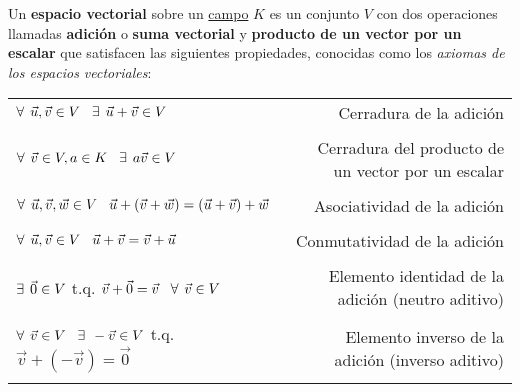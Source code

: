 \documentclass[notasLineal]{subfiles}
\begin{document}
\begin{tcolorbox}[breakable]
    \begin{Def}\label{Def: Espacio vectorial}
        Un \textbf{espacio vectorial} sobre un \hyperlink{Sssec: Definición de campo}{campo} $K$ es un conjunto $V$ con dos operaciones llamadas \textbf{adición} o \textbf{suma vectorial} y \textbf{producto de un vector por un escalar} que satisfacen las siguientes propiedades, conocidas como los \emph{axiomas de los espacios vectoriales}:
        
        \begin{center}
        \begin{tabular}{lr}
            $\forall\hspace{1.5mm} \vec{u},\vec{v}\in V \hspace{3mm}\exists \hspace{1.5mm} \vec{u}+\vec{v}\in V$ & Cerradura de la adición \\ \\ \multirow{2}{0.4\textwidth}{$\forall\hspace{1.5mm} \vec{v}\in V, a\in K \hspace{3mm}\exists \hspace{1.5mm} a\vec{v}\in V$} & \multirow{2}{0.28\textwidth}{Cerradura del producto de un vector por un escalar} \\ \\ \\
            $\forall\hspace{1.5mm} \vec{u},\vec{v},\vec{w}\in V\hspace{3mm}\vec{u}+(\vec{v}+\vec{w})=(\vec{u}+\vec{v})+\vec{w}$  & Asociatividad de la adición\\ \\
            $\forall\hspace{1.5mm} \vec{u},\vec{v}\in V\hspace{3mm}\vec{u}+\vec{v}=\vec{v}+\vec{u}$ & Conmutatividad de la adición \\ \\
            $\exists \hspace{1.5mm} \vec{0}\in V$ t.q. $\vec{v}+\vec{0}=\vec{v}\hspace{3mm}\forall\hspace{1.5mm} \vec{v} \in V$ & Elemento identidad de la adición (neutro aditivo) \\ \\
            $\forall\hspace{1.5mm}\vec{v}\in V \hspace{3mm}\exists\hspace{1.5mm} -\vec{v}\in V$ t.q. $\vec{v}+(-\vec{v})=\vec{0}$ & Elemento inverso de la adición (inverso aditivo) \\ \\

\end{tabular}
\end{center}
\end{Def}
\end{tcolorbox}
\end{document}
